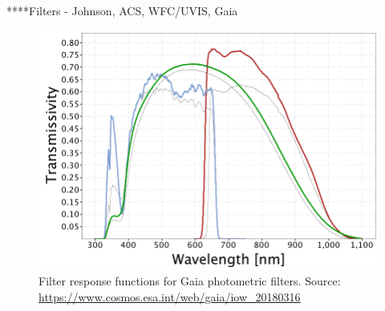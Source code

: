 \documentclass[12pt, a4paper]{report}
\begin{document}
****Filters - Johnson, ACS, WFC/UVIS, Gaia

\begin{figure}[h]
\begin{center}
\includegraphics[scale=0.5]{GaiaDR2Passbands.png}
\caption{Filter response functions for Gaia photometric filters. Source: \protect\url{https://www.cosmos.esa.int/web/gaia/iow_20180316}}
\label{Gaia_response_funcs}
\end{center}
\end{figure}
\end{document}
